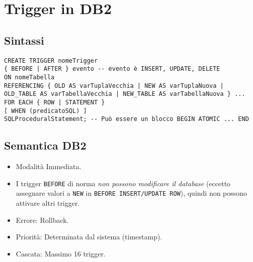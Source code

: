 \section{Trigger in DB2}
\subsection{Sintassi}
\begin{verbatim}
CREATE TRIGGER nomeTrigger
{ BEFORE | AFTER } evento -- evento è INSERT, UPDATE, DELETE
ON nomeTabella
REFERENCING { OLD AS varTuplaVecchia | NEW AS varTuplaNuova |
OLD_TABLE AS varTabellaVecchia | NEW_TABLE AS varTabellaNuova } ...
FOR EACH { ROW | STATEMENT }
[ WHEN (predicatoSQL) ]
SQLProceduralStatement; -- Può essere un blocco BEGIN ATOMIC ... END
\end{verbatim}

\subsection{Semantica DB2}
\begin{itemize}
	\item Modalità Immediata.
	\item I trigger \texttt{BEFORE} di norma \textit{non possono modificare il database} (eccetto assegnare valori a \texttt{NEW} in \texttt{BEFORE INSERT/UPDATE ROW}), quindi non possono attivare altri trigger.
	\item Errore: Rollback.
	\item Priorità: Determinata dal sistema (timestamp).
	\item Cascata: Massimo 16 trigger.
\end{itemize}

